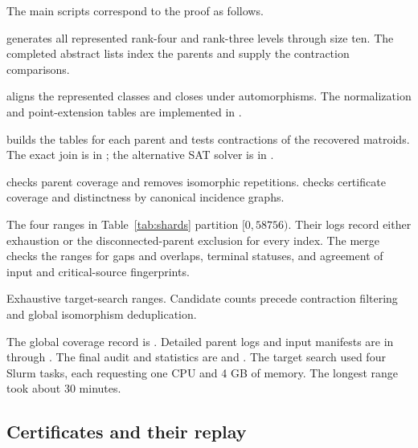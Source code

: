 \documentclass[11pt,a4paper]{article}
\theoremstyle{definition}
\begin{document}
The main scripts correspond to the proof as follows.
\begin{description}\raggedright
\item[Parent generation.] 
generates all represented rank-four and rank-three levels through
size ten. The completed abstract lists index the parents and
supply the contraction comparisons.
\item[Labelled representations.]
 aligns the represented
classes and closes under automorphisms. The normalization and
point-extension tables are implemented in
.
\item[Recovery and contraction testing.]
 builds the tables
for each parent and tests contractions of the recovered
matroids. The exact join is in
; the alternative SAT solver is in
.
\item[Merging and counting.]
 checks parent coverage and removes
isomorphic repetitions.  checks
certificate coverage and distinctness by canonical incidence
graphs.
\end{description}

The four ranges in Table~\ref{tab:shards} partition
$[0,58756)$. Their logs record either exhaustion or the
disconnected-parent exclusion for every index. The merge checks
the ranges for gaps and overlaps, terminal statuses, and
agreement of input and critical-source fingerprints.

\begin{table}[htbp]
\centering

\caption{Exhaustive target-search ranges. Candidate counts precede
contraction filtering and global isomorphism deduplication.}
\label{tab:shards}
\end{table}

The global coverage record is
. Detailed parent logs and
input manifests are in  through
. The final audit and statistics are
 and
. The target search used
four Slurm tasks, each requesting one CPU and 4 GB of memory.
The longest range took about 30 minutes.

\subsection{Certificates and their replay}
\end{document}
